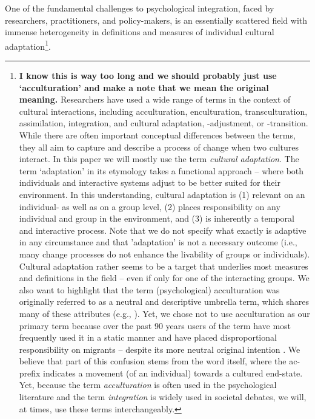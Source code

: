 \documentclass[man, 12pt, a4paper]{apa7}
\begin{document}
One of the fundamental challenges to psychological integration, faced by researchers, practitioners, and policy-makers, is an essentially scattered field with immense heterogeneity in definitions and measures of individual cultural adaptation\footnote{\textbf{I know this is way too long and we should probably just use `acculturation' and make a note that we mean the original meaning.} Researchers have used a wide range of terms in the context of cultural interactions, including acculturation, enculturation, transculturation, assimilation, integration, and cultural adaptation, -adjustment, or -transition. While there are often important conceptual differences between the terms, they all aim to capture and describe a process of change when two cultures interact. In this paper we will mostly use the term \textit{cultural adaptation}. The term `adaptation' in its etymology takes a functional approach -- where both individuals and interactive systems adjust to be better suited for their environment. In this understanding, cultural adaptation is (1) relevant on an individual- as well as on a group level, (2) places responsibility on any individual and group in the environment, and (3) is inherently a temporal and interactive process. Note that we do not specify what exactly is adaptive in any circumstance and that 'adaptation' is not a necessary outcome (i.e., many change processes do not enhance the livability of groups or individuals). Cultural adaptation rather seems to be a target that underlies most measures and definitions in the field -- even if only for one of the interacting groups. We also want to highlight that the term (psychological) acculturation was originally referred to as a neutral and descriptive umbrella term, which shares many of these attributes (e.g., \citealp{Berry2003}). Yet, we chose not to use acculturation as our primary term because over the past 90 years users of the term have most frequently used it in a static manner \citep{Brown2011, Ward2019} and have placed disproportional responsibility on migrants \citep{Bourhis1997a} -- despite its more neutral original intention \citep[e.g.,][]{Berry2009a}. We believe that part of this confusion stems from the word itself, where the ac- prefix indicates a movement (of an individual) towards a cultured end-state. Yet, because the term \textit{acculturation} is often used in the psychological literature and the term \textit{integration} is widely used in societal debates, we will, at times, use these terms interchangeably.}.
\end{document}
